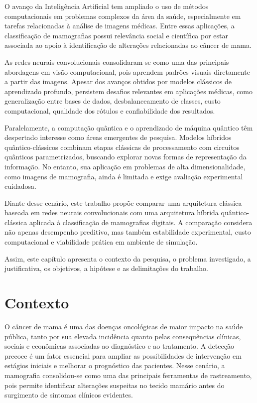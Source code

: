 \documentclass[
    12pt,
    openright,
    oneside,
    a4paper,
    english,
    brazil
]{abntex2}
\begin{document}
O avanço da Inteligência Artificial tem ampliado o uso de métodos computacionais em problemas complexos da área da saúde, especialmente em tarefas relacionadas à análise de imagens médicas. Entre essas aplicações, a classificação de mamografias possui relevância social e científica por estar associada ao apoio à identificação de alterações relacionadas ao câncer de mama.

As redes neurais convolucionais consolidaram-se como uma das principais abordagens em visão computacional, pois aprendem padrões visuais diretamente a partir das imagens. Apesar dos avanços obtidos por modelos clássicos de aprendizado profundo, persistem desafios relevantes em aplicações médicas, como generalização entre bases de dados, desbalanceamento de classes, custo computacional, qualidade dos rótulos e confiabilidade dos resultados.

Paralelamente, a computação quântica e o aprendizado de máquina quântico têm despertado interesse como áreas emergentes de pesquisa. Modelos híbridos quântico-clássicos combinam etapas clássicas de processamento com circuitos quânticos parametrizados, buscando explorar novas formas de representação da informação. No entanto, sua aplicação em problemas de alta dimensionalidade, como imagens de mamografia, ainda é limitada e exige avaliação experimental cuidadosa.

Diante desse cenário, este trabalho propõe comparar uma arquitetura clássica baseada em redes neurais convolucionais com uma arquitetura híbrida quântico-clássica aplicada à classificação de mamografias digitais. A comparação considera não apenas desempenho preditivo, mas também estabilidade experimental, custo computacional e viabilidade prática em ambiente de simulação.

Assim, este capítulo apresenta o contexto da pesquisa, o problema investigado, a justificativa, os objetivos, a hipótese e as delimitações do trabalho.

\section{Contexto}

O câncer de mama é uma das doenças oncológicas de maior impacto na saúde pública, tanto por sua elevada incidência quanto pelas consequências clínicas, sociais e econômicas associadas ao diagnóstico e ao tratamento. A detecção precoce é um fator essencial para ampliar as possibilidades de intervenção em estágios iniciais e melhorar o prognóstico das pacientes. Nesse cenário, a mamografia consolidou-se como uma das principais ferramentas de rastreamento, pois permite identificar alterações suspeitas no tecido mamário antes do surgimento de sintomas clínicos evidentes.
\end{document}
